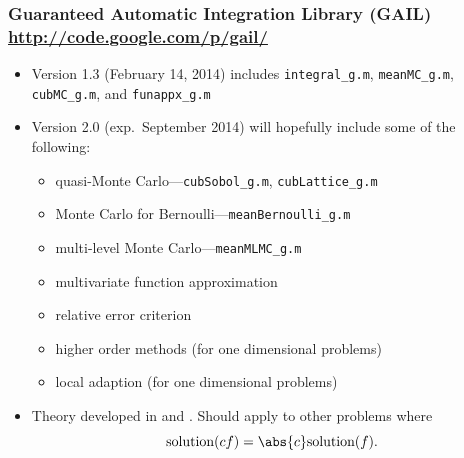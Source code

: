 \documentclass[10pt,compress]{beamer} %
\begin{document}
\begin{frame} \frametitle{Guaranteed Automatic Integration Library (GAIL) \url{http://code.google.com/p/gail/}}

\begin{itemize}

\item Version 1.3 (February 14, 2014) \cite{ChoEtal14a} includes \texttt{integral\_g.m}, \texttt{meanMC\_g.m}, \texttt{cubMC\_g.m}, and \texttt{funappx\_g.m} 

\item Version 2.0 (exp.\ September 2014) will hopefully include some of the following:
\begin{itemize} 
\item quasi-Monte Carlo---\texttt{cubSobol\_g.m}, \texttt{cubLattice\_g.m}
\item Monte Carlo for Bernoulli---\texttt{meanBernoulli\_g.m}
\item multi-level Monte Carlo---\texttt{meanMLMC\_g.m}
\item multivariate function approximation
\item relative error criterion

\item higher order methods (for one dimensional problems)

\item local adaption (for one dimensional problems)

\end{itemize}

\item Theory developed in  and .  Should apply to other problems where 
\[
\text{solution}(cf)=\abs{c}\text{solution}(f).
\]

\end{itemize}
\end{frame}

\end{document}
